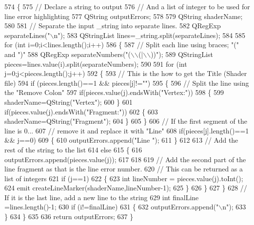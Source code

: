 \begin{DoxyCode}
574 \{
575   \textcolor{comment}{// Declare a string to output}
576   \textcolor{comment}{// And a list of integer to be used for line error highlighting}
577   QString outputErrors;
578 
579   QString shaderName;
580 
581   \textcolor{comment}{// Separate the input \_string into separate lines.}
582   QRegExp separateLines(\textcolor{stringliteral}{"\(\backslash\)n"});
583   QStringList lines=\_string.split(separateLines);
584 
585   \textcolor{keywordflow}{for} (\textcolor{keywordtype}{int} i=0;i<lines.length();i++)
586   \{
587     \textcolor{comment}{// Split each line using braces; "(" and ")"}
588     QRegExp separateNumbers(\textcolor{stringliteral}{"(\(\backslash\)\(\backslash\)(|\(\backslash\)\(\backslash\)))"});
589     QStringList pieces=lines.value(i).split(separateNumbers);
590 
591     \textcolor{keywordflow}{for} (\textcolor{keywordtype}{int} j=0;j<pieces.length();j++)
592     \{
593       \textcolor{comment}{// This is the how to get the Title (Shader file)}
594       \textcolor{keywordflow}{if} (pieces.length()==1 && pieces[j]!=\textcolor{stringliteral}{""})
595       \{
596         \textcolor{comment}{// Split the line using the "Remove Colon"}
597         \textcolor{keywordflow}{if}(pieces.value(j).endsWith(\textcolor{stringliteral}{"Vertex:"}))
598         \{
599           shaderName=QString(\textcolor{stringliteral}{"Vertex"});
600         \}
601         \textcolor{keywordflow}{if}(pieces.value(j).endsWith(\textcolor{stringliteral}{"Fragment:"}))
602         \{
603           shaderName=QString(\textcolor{stringliteral}{"Fragment"});
604         \}
605       \}
606       \textcolor{comment}{// If the first segment of the line is 0...}
607       \textcolor{comment}{// remove it and replace it with "Line"}
608       \textcolor{keywordflow}{if}(pieces[j].length()==1 && j==0)
609       \{
610         outputErrors.append(\textcolor{stringliteral}{"Line "});
611       \}
612 
613       \textcolor{comment}{// Add the rest of the string to the list}
614       \textcolor{keywordflow}{else}
615       \{
616         outputErrors.append(pieces.value(j));
617 
618 
619         \textcolor{comment}{// Add the second part of the line fragment as that is the line error number.}
620         \textcolor{comment}{// This can be returned as a list of integers}
621         \textcolor{keywordflow}{if} (j==1)
622         \{
623           \textcolor{keywordtype}{int} lineNumber = pieces.value(j).toInt();
624           emit createLineMarker(shaderName,lineNumber-1);
625         \}
626       \}
627     \}
628     \textcolor{comment}{// If it is the last line, add a new line to the string}
629     \textcolor{keywordtype}{int} finalLine =lines.length()-1;
630     \textcolor{keywordflow}{if} (i!=finalLine)
631     \{
632       outputErrors.append(\textcolor{stringliteral}{"\(\backslash\)n"});
633     \}
634   \}
635 
636   \textcolor{keywordflow}{return} outputErrors;
637 \}
\end{DoxyCode}


